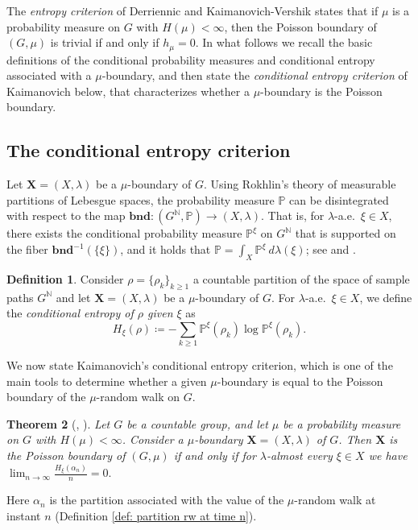 \documentclass[reqno,oneside,11pt]{amsart}
\renewcommand{\P}{\mathbb{P}}
\theoremstyle{plain}
\newtheorem{thm}{Theorem}[section] %
\theoremstyle{definition}
\newtheorem{defn}[thm]{Definition} %
\begin{document}
The \emph{entropy criterion} of Derriennic \cite{Derrienic1980} and Kaimanovich-Vershik \cite{KaimanovcihVershik1983} states that if $\mu$ is a probability measure on $G$ with $H(\mu)<\infty$, then the Poisson boundary of $(G,\mu)$ is trivial if and only if $h_{\mu}=0.$ In what follows we recall the basic definitions of the conditional probability measures and conditional entropy associated with a $\mu$-boundary, and then state the \emph{conditional entropy criterion} of Kaimanovich below, that characterizes whether a $\mu$-boundary is the Poisson boundary.

\subsection{The conditional entropy criterion}

Let $\mathbf{X}=(X,\lambda)$ be a $\mu$-boundary of $G$. Using Rokhlin's theory of measurable partitions of Lebesgue spaces, the probability measure $\P$ can be disintegrated with respect to the map $\mathbf{bnd}:(G^{\mathbb{N}},\P)\to (X,\lambda)$. That is, for $\lambda$-a.e.\ $\xi \in X$,  there exists the conditional probability measure $\P^{\xi}$ on $G^{\mathbb{N}}$ that is supported on the fiber $\mathbf{bnd}^{-1}(\{\xi\})$, and it holds that 	$\P=\int_{X}\P^{\xi}\ d\lambda (\xi)$; see \cite[Section I.7]{Rohlin1967} and \cite[Section 3]{Kaimanovich2000}.


\begin{defn}\label{defn: average conditional entropy}
	Consider $\rho=\{\rho_k\}_{k\ge 1}$ a countable partition of the space of sample paths $G^{\mathbb{N}}$ and let $\mathbf{X}=(X,\lambda)$ be a $\mu$-boundary of $G$. For $\lambda$-a.e.\ $\xi\in X$, we define the \emph{conditional entropy of $\rho$ given $\xi$} as
	\begin{equation*}
		H_{\xi}(\rho)\coloneqq-\sum_{k\ge 1}\P^{\xi}(\rho_k)\log \P^{\xi}(\rho_k).
	\end{equation*}
\end{defn}

We now state Kaimanovich's conditional entropy criterion, which is one of the main tools to determine whether a given $\mu$-boundary is equal to the Poisson boundary of the $\mu$-random walk on $G$.

\begin{thm}[{\cite[Theorem 2]{Kaimanovich1985conditional}, \cite[Theorem 4.6]{Kaimanovich2000}}] \label{thm: conditional entropy criterion - Kaimanovich}
	Let $G$ be a countable group, and let $\mu$ be a probability measure on $G$ with $H(\mu)<\infty$. Consider a $\mu$-boundary $\mathbf{X}=(X,\lambda)$ of $G$. Then $\mathbf{X}$ is the Poisson boundary of $(G,\mu)$ if and only if for $\lambda$-almost every $\xi \in X$ we have $\lim_{n\to \infty}\frac{H_{\xi}(\alpha_n)}{n}=0.$
	
\end{thm}
Here $\alpha_n$ is the partition associated with the value of the $\mu$-random walk at instant $n$ (Definition \ref{def: partition rw at time n}). 
\end{document}

